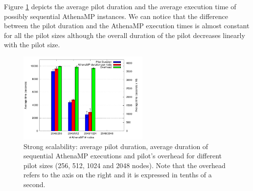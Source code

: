 Figure \ref{fig:strongScala} depicts the average pilot duration and  the average execution time of possibly sequential AthenaMP instances.  We can notice that the difference between the pilot duration and the AthenaMP execution times is almost constant for all the pilot sizes although the overall duration of the pilot decreases linearly with the pilot size.

\begin{figure}[!htb]
        \includegraphics[height=4.5cm,width=\columnwidth]{./figures/NGE/strong.pdf}
    \caption{Strong scalability:  average pilot duration, average duration of sequential AthenaMP executions and pilot's overhead for different pilot sizes (256, 512, 1024 and 2048 nodes). Note that the overhead refers to the axis on the right and it is expressed in tenths of a second.}
\label{fig:strongScala}
\end{figure}



%

 
%
%

